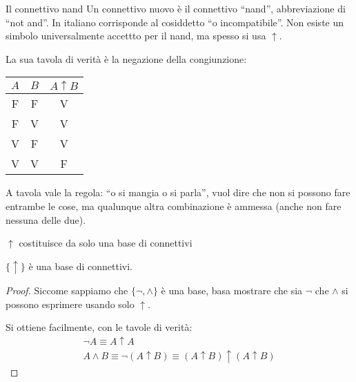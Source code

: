 \documentclass[aspectratio=169,10pt,dvipsnames,xcolor=table,handout]{beamer}
\begin{document}
\begin{frame}{Il connettivo nand}
    Un connettivo nuovo è il connettivo ``\alert{nand}'', abbreviazione di ``not and''. In italiano corrisponde al cosiddetto ``\alert{o incompatibile}''. Non esiste un simbolo universalmente accettto per il nand, ma spesso si usa $\uparrow$.

    \medskip
    La sua tavola di verità è la negazione della congiunzione:
    \begin{center}
        \begin{tabular}{c|c||c}
            $A$ & $B$ & $A \uparrow B$ \\
            \hline
            F   & F   & V         \\
            F   & V   & V         \\
            V   & F   & V         \\
            V   & V   & F
        \end{tabular}
    \end{center}

    \begin{example}
        A tavola vale la regola: ``o si mangia o si parla'', vuol dire che non si possono fare entrambe le cose, ma qualunque altra combinazione è ammessa (anche non fare nessuna delle due).
    \end{example}
\end{frame}

\begin{frame}{$\uparrow$ costituisce da solo una base di connettivi}
    \begin{theorem}
        $\{ \uparrow \}$ è una base di connettivi.
    \end{theorem}
    \begin{proof}
     Siccome sappiamo che $\{\neg, \wedge\}$ è una base, basa mostrare che sia $\neg$ che $\wedge$ si possono esprimere usando solo $\uparrow$.

    \medskip
    Si ottiene facilmente, con le tavole di verità:
    \begin{gather*}
        \neg A \equiv A \uparrow A\\
        A \wedge B \equiv \neg(A \uparrow B) \equiv (A \uparrow B) \uparrow (A \uparrow B)
    \end{gather*}
    \end{proof}
\end{frame}
\end{document}
